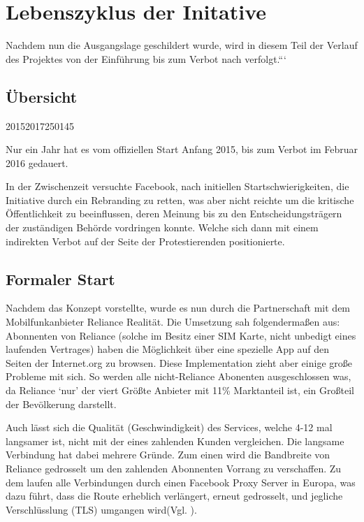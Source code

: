\documentclass{article}
\begin{document}
\section{Lebenszyklus der Initative}

Nachdem nun die Ausgangslage geschildert wurde, wird in diesem Teil der Verlauf des Projektes von der Einführung bis zum Verbot nach verfolgt.```

\subsection{Übersicht}

\begin{timeline}{2015}{2017}{250}{145}
\end{timeline}

Nur ein Jahr hat es vom offiziellen Start Anfang 2015, bis zum Verbot im Februar 2016 gedauert.

In der Zwischenzeit versuchte Facebook, nach initiellen Startschwierigkeiten, die Initiative durch ein Rebranding zu retten, was aber nicht reichte um die kritische Öffentlichkeit zu beeinflussen, deren Meinung bis zu den Entscheidungsträgern der zuständigen Behörde vordringen konnte.
Welche sich dann mit einem indirekten Verbot auf der Seite der Protestierenden positionierte.

\subsection{Formaler Start} \label{formal}

Nachdem \textcite{HumanRight} das Konzept vorstellte, wurde es nun durch die Partnerschaft mit dem Mobilfunkanbieter Reliance Realität.
Die Umsetzung sah folgendermaßen aus: Abonnenten von Reliance (solche im Besitz einer SIM Karte, nicht unbedigt eines laufenden Vertrages) haben die Möglichkeit über eine spezielle App auf den Seiten der Internet.org zu browsen.
Diese Implementation zieht aber einige große Probleme mit sich. So werden alle nicht-Reliance Abonenten ausgeschlossen was, da Reliance `nur' der viert Größte Anbieter mit 11\% Marktanteil\autocite{mobileSubscribers} ist, ein Großteil der Bevölkerung darstellt.

Auch lässt sich die Qualität (Geschwindigkeit) des Services, welche 4-12 mal langsamer ist, nicht mit der eines zahlenden Kunden vergleichen.
Die langsame Verbindung hat dabei mehrere Gründe. Zum einen wird die Bandbreite von Reliance gedrosselt um den zahlenden Abonnenten Vorrang zu verschaffen. Zu dem laufen alle Verbindungen durch einen Facebook Proxy Server in Europa, was dazu führt, dass die Route erheblich verlängert, erneut gedrosselt, und jegliche Verschlüsslung (TLS) umgangen wird(Vgl. \cite{walledGarden}).
\end{document}
